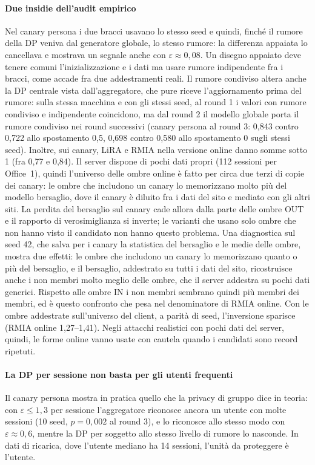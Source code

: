 \paragraph{Due insidie dell'audit empirico}
Nel canary persona i due bracci usavano lo stesso seed e quindi, finché il rumore della DP
veniva dal generatore globale, lo stesso rumore: la differenza appaiata lo cancellava e
mostrava un segnale anche con $\varepsilon\approx0{,}08$. Un disegno appaiato deve tenere
comuni l'inizializzazione e i dati ma usare rumore indipendente fra i bracci, come accade fra
due addestramenti reali. Il rumore condiviso altera anche la DP centrale vista
dall'aggregatore, che pure riceve l'aggiornamento prima del rumore: sulla stessa macchina e
con gli stessi seed, al round 1 i valori con rumore condiviso e indipendente coincidono, ma dal round 2 il modello globale porta il rumore
condiviso nei round successivi (canary persona al round 3: 0,843 contro 0,722 allo spostamento
0,5, 0,698 contro 0,580 allo spostamento 0 sugli stessi seed). Inoltre, sui canary, LiRA e RMIA nella versione online danno somme
sotto 1 (fra 0,77 e 0,84). Il server dispone di pochi dati propri (112 sessioni per Office~1),
quindi l'universo delle ombre online è fatto per circa due terzi di copie dei canary: le ombre
che includono un canary lo memorizzano molto più del modello bersaglio, dove il canary è
diluito fra i dati del sito e mediato con gli altri siti. La perdita del bersaglio sul canary
cade allora dalla parte delle ombre OUT e il rapporto di verosimiglianza si inverte; le
varianti che usano solo ombre che non hanno visto il candidato non hanno questo problema.
Una diagnostica sul seed 42, che salva per i canary la statistica del bersaglio e le medie delle
ombre, mostra due effetti: le ombre che includono un canary lo memorizzano quanto o più del
bersaglio, e il bersaglio, addestrato su tutti i dati del sito, ricostruisce anche i non membri
molto meglio delle ombre, che il server addestra su pochi dati generici. Rispetto alle ombre IN i
non membri sembrano quindi più membri dei membri, ed è questo confronto che pesa nel denominatore
di RMIA online. Con le ombre addestrate sull'universo del client, a parità di seed, l'inversione
sparisce (RMIA online 1,27--1,41). Negli attacchi realistici con pochi dati del server, quindi,
le forme online vanno usate con cautela quando i candidati sono record ripetuti.

\paragraph{La DP per sessione non basta per gli utenti frequenti}
Il canary persona mostra in pratica quello che la privacy di gruppo dice in teoria: con
$\varepsilon\le1{,}3$ per sessione l'aggregatore riconosce ancora un utente con molte sessioni
(10 seed, $p=0{,}002$ al round 3), e lo riconosce allo stesso modo con $\varepsilon\approx0{,}6$,
mentre la DP per soggetto allo stesso livello di rumore lo nasconde. In dati di ricarica, dove
l'utente mediano ha 14 sessioni, l'unità da proteggere è l'utente.

